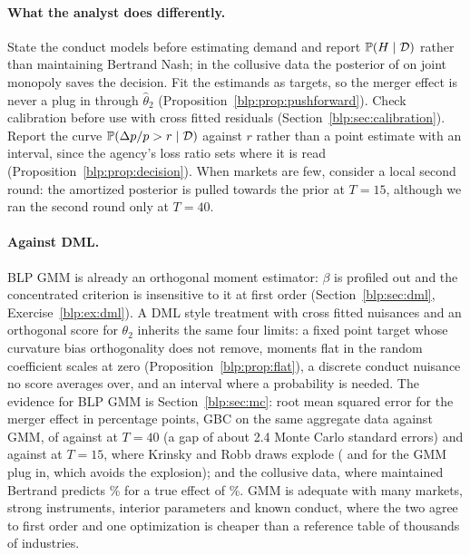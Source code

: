 \paragraph{What the analyst does differently.} State the conduct models before estimating demand and report $\mathbb{P}(H\mid\mathcal{D})$ rather than maintaining Bertrand Nash; in the collusive data the posterior of \nummscollusionpc{} on joint monopoly saves the decision. Fit the estimands as targets, so the merger effect is never a plug in through $\hat\theta_2$ (Proposition~\ref{blp:prop:pushforward}). Check calibration before use with cross fitted residuals (Section~\ref{blp:sec:calibration}). Report the curve $\mathbb{P}(\Delta p/p > r\mid\mathcal{D})$ against $r$ rather than a point estimate with an interval, since the agency's loss ratio sets where it is read (Proposition~\ref{blp:prop:decision}). When markets are few, consider a local second round: the amortized posterior is pulled towards the prior at $T=15$, although we ran the second round only at $T=40$.

\paragraph{Against DML.} BLP GMM is already an orthogonal moment estimator: $\beta$ is profiled out and the concentrated criterion is insensitive to it at first order (Section~\ref{blp:sec:dml}, Exercise~\ref{blp:ex:dml}). A DML style treatment with cross fitted nuisances and an orthogonal score for $\theta_2$ inherits the same four limits: a fixed point target whose curvature bias orthogonality does not remove, moments flat in the random coefficient scales at zero (Proposition~\ref{blp:prop:flat}), a discrete conduct nuisance no score averages over, and an interval where a probability is needed. The evidence for BLP GMM is Section~\ref{blp:sec:mc}: root mean squared error for the merger effect in percentage points, GBC on the same aggregate data against GMM, of \nummcdprmsenmxl{} against \nummcdprmsegmmxl{} at $T=40$ (a gap of about 2.4 Monte Carlo standard errors) and \nummcdprmsenmxv{} against \nummcdprmsegmmxv{} at $T=15$, where Krinsky and Robb draws explode (\nummcdprmseplugxl{} and \nummcdprmseplugxv{} for the GMM plug in, which avoids the explosion); and the collusive data, where maintained Bertrand predicts \nummscollusiongmm\% for a true effect of \nummscollusiontrue\%. GMM is adequate with many markets, strong instruments, interior parameters and known conduct, where the two agree to first order and one optimization is cheaper than a reference table of thousands of industries.

